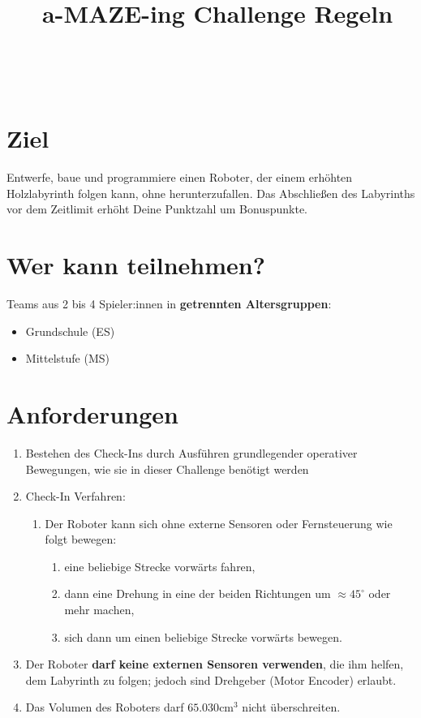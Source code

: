 \documentclass[a4paper,12pt]{article}
\begin{document}



\title{\tagYear\ a-MAZE-ing Challenge Regeln}

\makeatletter
\let\inserttitle\@title
\makeatother
\begin{center}
	\rrgerLogo
	\huge                      %
	\bfseries                   %
	\\
	\inserttitle
\end{center}
\section{Ziel}
Entwerfe, baue und programmiere einen Roboter, der einem erhöhten Holzlabyrinth
folgen kann, ohne herunterzufallen. Das Abschließen des Labyrinths vor dem
Zeitlimit erhöht Deine Punktzahl um Bonuspunkte.

\section{Wer kann teilnehmen?}
Teams aus 2 bis 4 Spieler:innen in \textbf{getrennten Altersgruppen}:

\begin{itemize}
	\item Grundschule (ES)
	\item Mittelstufe (MS)
\end{itemize}
\combineDivisions

\section{Anforderungen}
\robotRequirements
\begin{enumerate}
	\item Bestehen des Check-Ins durch Ausführen grundlegender operativer
		Bewegungen, wie sie in dieser Challenge benötigt werden
	\item Check-In Verfahren:
	\begin{enumerate}
		\item Der Roboter kann sich ohne externe Sensoren oder
			Fernsteuerung wie folgt bewegen:
		\begin{enumerate}
			\item eine beliebige Strecke vorwärts fahren,
			\item dann eine Drehung in eine der beiden Richtungen
				um $\approx 45^{\circ}$ oder mehr machen,
			\item sich dann um einen beliebige Strecke vorwärts
				bewegen.
		\end{enumerate}
	\end{enumerate}
	\item Der Roboter \textbf{darf keine externen Sensoren verwenden}, die
		ihm helfen, dem Labyrinth zu folgen; jedoch sind Drehgeber
		(Motor Encoder) erlaubt.
	\item Das Volumen des Roboters darf $65.030 \mathrm{cm}^{3}$ nicht überschreiten.
\end{enumerate}
\end{document}

